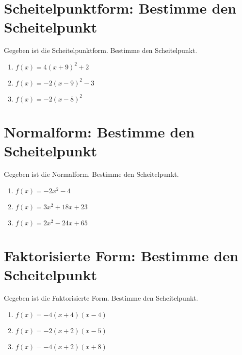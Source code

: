 \documentclass{article}%
\begin{document}
%
\section{Scheitelpunktform: Bestimme den Scheitelpunkt}%
\label{sec:ScheitelpunktformBestimmedenScheitelpunkt}%
Gegeben ist die Scheitelpunktform. Bestimme den Scheitelpunkt.%
\begin{enumerate}[label=\alph*)]%
\item%
\newline\vspace{0.5cm} $f(x)=4(x+9)^2 +2$%
\item%
\newline\vspace{0.5cm} $f(x)=-2(x-9)^2 -3$%
\item%
\newline\vspace{0.5cm} $f(x)=-2(x-8)^2$%
\end{enumerate}

%
\section{Normalform: Bestimme den Scheitelpunkt}%
\label{sec:NormalformBestimmedenScheitelpunkt}%
Gegeben ist die Normalform. Bestimme den Scheitelpunkt.%
\begin{enumerate}[label=\alph*)]%
\item%
\newline\vspace{0.5cm} $f(x)=-2x^2 - 4$%
\item%
\newline\vspace{0.5cm} $f(x)=3x^2 + 18x + 23$%
\item%
\newline\vspace{0.5cm} $f(x)=2x^2 - 24x + 65$%
\end{enumerate}

%
\section{Faktorisierte Form: Bestimme den Scheitelpunkt}%
\label{sec:FaktorisierteFormBestimmedenScheitelpunkt}%
Gegeben ist die Faktorisierte Form. Bestimme den Scheitelpunkt.%
\begin{enumerate}[label=\alph*)]%
\item%
\newline\vspace{0.5cm} $f(x)=-4(x+4)(x-4)$%
\item%
\newline\vspace{0.5cm} $f(x)=-2(x+2)(x-5)$%
\item%
\newline\vspace{0.5cm} $f(x)=-4(x+2)(x+8)$%
\end{enumerate}
\end{document}
